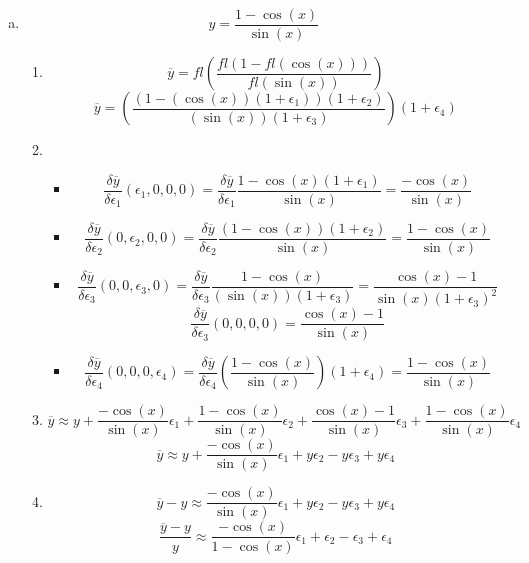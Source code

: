 \documentclass[12pt,a4paper]{article}
\begin{document}
\begin{enumerate}[(a)]
\item
\[
y= \frac{1-\cos(x)}{\sin(x)}
\]
\begin{enumerate}[1.]
\item
\[
\overline{y} = fl\left(\frac{fl(1-fl(\cos(x)))}{fl(\sin(x))}\right)
\]
\[
\overline{y} = \left(\frac{(1-(\cos(x))(1+\epsilon_1))(1+\epsilon_2)}{(\sin(x))(1+\epsilon_3)}\right)(1+\epsilon_4)
\]
\item
\begin{itemize}
\item
\[
\frac{\delta\overline{y}}{\delta\epsilon_1}(\epsilon_1,0,0,0)
= \frac{\delta\overline{y}}{\delta\epsilon_1}
\frac{1-\cos(x)(1+\epsilon_1)}{\sin(x)}
= \frac{-\cos(x)}{\sin(x)}
\]
\item
\[
\frac{\delta\overline{y}}{\delta\epsilon_2}(0,\epsilon_2,0,0)
= \frac{\delta\overline{y}}{\delta\epsilon_2}
\frac{(1-\cos(x))(1+\epsilon_2)}{\sin(x)}
= \frac{1-\cos(x)}{\sin(x)}
\]
\item
\[
\frac{\delta\overline{y}}{\delta\epsilon_3}(0,0,\epsilon_3,0)
= \frac{\delta\overline{y}}{\delta\epsilon_3} 
\frac{1-\cos(x)}{(\sin(x))(1+\epsilon_3)}
= \frac{\cos(x)-1}{\sin(x)(1+\epsilon_3)^2}
\]
\[
\frac{\delta\overline{y}}{\delta\epsilon_3}(0,0,0,0)
= \frac{\cos(x)-1}{\sin(x)}
\]
\item
\[
\frac{\delta\overline{y}}{\delta\epsilon_4}(0,0,0,\epsilon_4)
= \frac{\delta\overline{y}}{\delta\epsilon_4} 
\left(\frac{1-\cos(x)}{\sin(x)}\right)(1+\epsilon_4)
= \frac{1-\cos(x)}{\sin(x)}
\]
\end{itemize}
\item
\[
\overline{y} \approx y +
\frac{-\cos(x)}{\sin(x)} \epsilon_1
+
\frac{1-\cos(x)}{\sin(x)} \epsilon_2
+
\frac{\cos(x)-1}{\sin(x)} \epsilon_3
+
\frac{1-\cos(x)}{\sin(x)} \epsilon_4
\]
\[
\overline{y} \approx y +
\frac{-\cos(x)}{\sin(x)} \epsilon_1
+ y \epsilon_2
- y \epsilon_3
+ y \epsilon_4
\]
\item
\[
\overline{y} - y \approx 
\frac{-\cos(x)}{\sin(x)} \epsilon_1
+ y \epsilon_2
- y \epsilon_3
+ y \epsilon_4
\]
\[
\frac{\overline{y}-y}{y} \approx 
\frac{-\cos(x)}{1-\cos(x)} \epsilon_1
+ \epsilon_2
- \epsilon_3
+ \epsilon_4
\]
\end{enumerate}


\end{enumerate}
\end{document}
